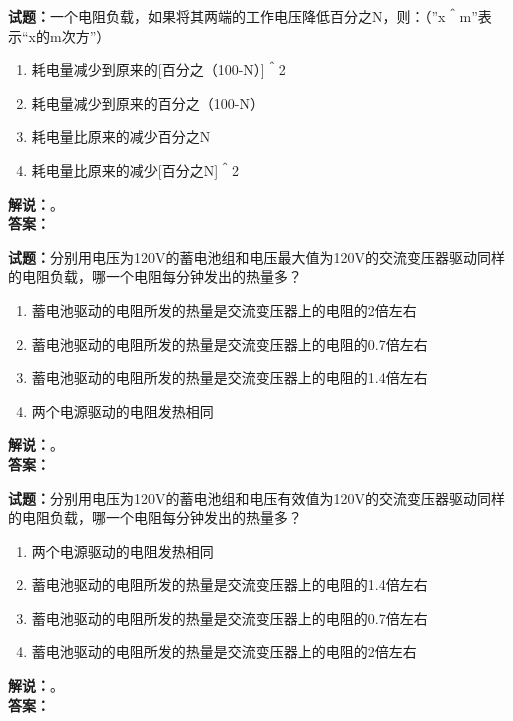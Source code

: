 \documentclass{ctexbook}
\begin{document}
\vspace{\baselineskip}

\noindent\textbf{试题：}一个电阻负载，如果将其两端的工作电压降低百分之N，则：（”x＾m”表示“x的m次方”）
\begin{enumerate}[leftmargin=3em]
  \item 耗电量减少到原来的[百分之（100-N）]＾2
  \item 耗电量减少到原来的百分之（100-N）
  \item 耗电量比原来的减少百分之N
  \item 耗电量比原来的减少[百分之N]＾2
\end{enumerate}
\noindent\textbf{解说：}\textbf{}。\\\noindent\textbf{答案：}

\vspace{\baselineskip}

\noindent\textbf{试题：}分别用电压为120V的蓄电池组和电压最大值为120V的交流变压器驱动同样的电阻负载，哪一个电阻每分钟发出的热量多？
\begin{enumerate}[leftmargin=3em]
  \item 蓄电池驱动的电阻所发的热量是交流变压器上的电阻的2倍左右
  \item 蓄电池驱动的电阻所发的热量是交流变压器上的电阻的0.7倍左右
  \item 蓄电池驱动的电阻所发的热量是交流变压器上的电阻的1.4倍左右
  \item 两个电源驱动的电阻发热相同
\end{enumerate}
\noindent\textbf{解说：}\textbf{}。\\\noindent\textbf{答案：}

\vspace{\baselineskip}

\noindent\textbf{试题：}分别用电压为120V的蓄电池组和电压有效值为120V的交流变压器驱动同样的电阻负载，哪一个电阻每分钟发出的热量多？
\begin{enumerate}[leftmargin=3em]
  \item 两个电源驱动的电阻发热相同
  \item 蓄电池驱动的电阻所发的热量是交流变压器上的电阻的1.4倍左右
  \item 蓄电池驱动的电阻所发的热量是交流变压器上的电阻的0.7倍左右
  \item 蓄电池驱动的电阻所发的热量是交流变压器上的电阻的2倍左右
\end{enumerate}
\noindent\textbf{解说：}\textbf{}。\\\noindent\textbf{答案：}

\vspace{\baselineskip}
\end{document}
